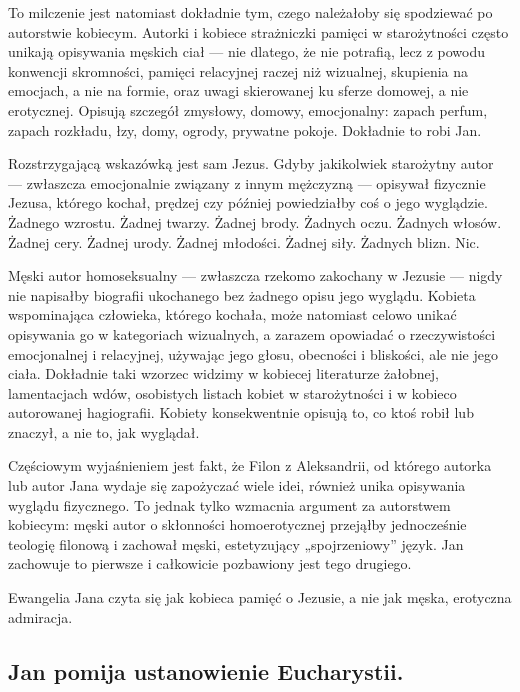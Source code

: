 To milczenie jest natomiast dokładnie tym, czego należałoby się spodziewać po autorstwie kobiecym.
Autorki i kobiece strażniczki pamięci w starożytności często unikają opisywania męskich ciał --- nie dlatego, że nie potrafią, lecz z powodu konwencji skromności, pamięci relacyjnej raczej niż wizualnej, skupienia na emocjach, a nie na formie, oraz uwagi skierowanej ku sferze domowej, a nie erotycznej.
Opisują szczegół zmysłowy, domowy, emocjonalny: zapach perfum, zapach rozkładu, łzy, domy, ogrody, prywatne pokoje.
Dokładnie to robi Jan.

Rozstrzygającą wskazówką jest sam Jezus.
Gdyby jakikolwiek starożytny autor --- zwłaszcza emocjonalnie związany z innym mężczyzną --- opisywał fizycznie Jezusa, którego kochał, prędzej czy później powiedziałby coś o jego wyglądzie.
Żadnego wzrostu.
Żadnej twarzy.
Żadnej brody.
Żadnych oczu.
Żadnych włosów.
Żadnej cery.
Żadnej urody.
Żadnej młodości.
Żadnej siły.
Żadnych blizn.
Nic.

Męski autor homoseksualny --- zwłaszcza rzekomo zakochany w Jezusie --- nigdy nie napisałby biografii ukochanego bez żadnego opisu jego wyglądu.
Kobieta wspominająca człowieka, którego kochała, może natomiast celowo unikać opisywania go w kategoriach wizualnych, a zarazem opowiadać o rzeczywistości emocjonalnej i relacyjnej, używając jego głosu, obecności i bliskości, ale nie jego ciała.
Dokładnie taki wzorzec widzimy w kobiecej literaturze żałobnej, lamentacjach wdów, osobistych listach kobiet w starożytności i w kobieco autorowanej hagiografii.
Kobiety konsekwentnie opisują to, co ktoś robił lub znaczył, a nie to, jak wyglądał.

Częściowym wyjaśnieniem jest fakt, że Filon z Aleksandrii, od którego autorka lub autor Jana wydaje się zapożyczać wiele idei, również unika opisywania wyglądu fizycznego.
To jednak tylko wzmacnia argument za autorstwem kobiecym:
męski autor o skłonności homoerotycznej przejąłby jednocześnie teologię filonową i zachował męski, estetyzujący „spojrzeniowy” język.
Jan zachowuje to pierwsze i całkowicie pozbawiony jest tego drugiego.

Ewangelia Jana czyta się jak kobieca pamięć o Jezusie, a nie jak męska, erotyczna admiracja.

\subsection{Jan pomija ustanowienie Eucharystii.}\label{subsec:john-leaves-out-the-institution-of-the-eucharist.}

